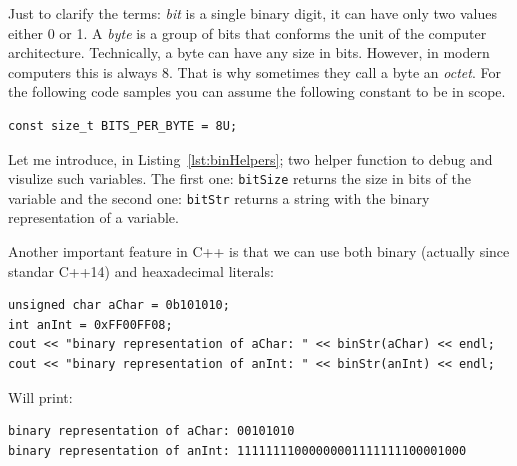 Just to clarify the terms: \emph{bit} is a single binary digit, it can have only two values either 0 or 1. A \emph{byte} is a group of bits that conforms the unit of the computer architecture. Technically, a byte can have any size in bits. However, in modern computers this is always 8. That is why sometimes they call a byte an \emph{octet}. For the following code samples you can assume the following constant to be in scope.

\begin{verbatim}
const size_t BITS_PER_BYTE = 8U;
\end{verbatim}

Let me introduce, in Listing~\ref{lst:binHelpers}; two helper function to debug and visulize such variables. The first one: \texttt{bitSize} returns the size in bits of the variable and the second one: \texttt{bitStr} returns a string with the binary representation of a variable.

{\centering
\begin{minipage}{\linewidth}
\end{minipage}
\par
}

Another important feature in C++ is that we can use both binary (actually since standar C++14) and heaxadecimal literals:
\begin{verbatim}
unsigned char aChar = 0b101010;
int anInt = 0xFF00FF08;
cout << "binary representation of aChar: " << binStr(aChar) << endl;
cout << "binary representation of anInt: " << binStr(anInt) << endl;
\end{verbatim}
Will print:
\begin{verbatim}
binary representation of aChar: 00101010
binary representation of anInt: 11111111000000001111111100001000
\end{verbatim} 


